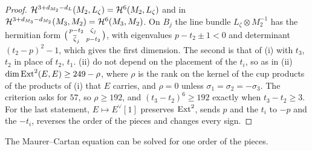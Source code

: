 \begin{proof}
$\mathcal{H}^{3+d_{M_{2}}-d_{L}}(M_{2},L_{\zeta})=\mathcal{H}^{6}(M_{2},L_{\zeta})$ and in
$\mathcal{H}^{3+d_{M_{3}}-d_{M_{2}}}(M_{3},M_{2})=\mathcal{H}^{6}(M_{3},M_{2})$. On $B_{j}$
the line bundle $L_{\zeta}\otimes M_{2}^{-1}$ has the hermitian form
$\bigl(\begin{smallmatrix}p-t_{2}&\zeta_{j}\\ \overline{\zeta}_{j}&p-t_{2}
\end{smallmatrix}\bigr)$, with eigenvalues $p-t_{2}\pm1<0$ and determinant
$(t_{2}-p)^{2}-1$, which gives the first dimension. The second is that of
(i) with $t_{3}$, $t_{2}$ in place of $t_{2}$,
$t_{1}$.
(ii)  do not depend on the
placement of the $t_{i}$, so as in (ii)
$\dim\operatorname{Ext}^{2}(E,E)\ge249-\rho$, where $\rho$ is the rank on the kernel of
the cup products of the products of (i) that $E$ carries, and $\rho=0$
unless $\sigma_{1}=\sigma_{2}=-\sigma_{3}$. The criterion asks for $57$,
so $\rho\ge192$, and $(t_{3}-t_{2})^{6}\ge192$ exactly when
$t_{3}-t_{2}\ge3$. For the last statement, $E\mapsto E^{\vee}[1]$ preserves
$\operatorname{Ext}^{2}$, sends $p$ and the $t_{i}$ to $-p$ and the $-t_{i}$, reverses the
order of the pieces and changes every sign.
\end{proof}

The Maurer--Cartan equation can be solved for one order of the pieces.

